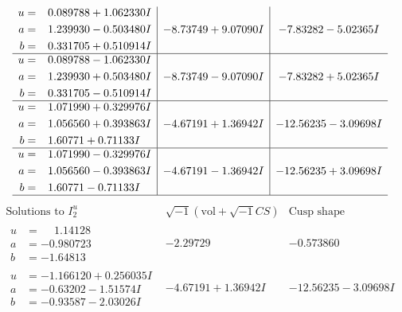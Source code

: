 \documentclass[1p]{elsarticle_modified}
\theoremstyle{definition}
\newcommand{\I}{\sqrt{-1}}
\begin{document}
$$\begin{array}{c|c|c}
\begin{aligned}
u &= \phantom{-}0.089788 + 1.062330 I \\
a &= \phantom{-}1.239930 - 0.503480 I \\
b &= \phantom{-}0.331705 + 0.510914 I\end{aligned}
 & -8.73749 + 9.07090 I & -7.83282 - 5.02365 I \\ \hline\begin{aligned}
u &= \phantom{-}0.089788 - 1.062330 I \\
a &= \phantom{-}1.239930 + 0.503480 I \\
b &= \phantom{-}0.331705 - 0.510914 I\end{aligned}
 & -8.73749 - 9.07090 I & -7.83282 + 5.02365 I \\ \hline\begin{aligned}
u &= \phantom{-}1.071990 + 0.329976 I \\
a &= \phantom{-}1.056560 + 0.393863 I \\
b &= \phantom{-}1.60771 + 0.71133 I\end{aligned}
 & -4.67191 + 1.36942 I & -12.56235 - 3.09698 I \\ \hline\begin{aligned}
u &= \phantom{-}1.071990 - 0.329976 I \\
a &= \phantom{-}1.056560 - 0.393863 I \\
b &= \phantom{-}1.60771 - 0.71133 I\end{aligned}
 & -4.67191 - 1.36942 I & -12.56235 + 3.09698 I\\
 \hline 
 \end{array}$$\newpage$$\begin{array}{c|c|c}  
\text{Solutions to }I^u_{2}& \I (\text{vol} + \sqrt{-1}CS) & \text{Cusp shape}\\
 \hline 
\begin{aligned}
u &= \phantom{-}1.14128\phantom{ +0.000000I} \\
a &= -0.980723\phantom{ +0.000000I} \\
b &= -1.64813\phantom{ +0.000000I}\end{aligned}
 & -2.29729\phantom{ +0.000000I} & -0.573860\phantom{ +0.000000I} \\ \hline\begin{aligned}
u &= -1.166120 + 0.256035 I \\
a &= -0.63202 - 1.51574 I \\
b &= -0.93587 - 2.03026 I\end{aligned}
 & -4.67191 + 1.36942 I & -12.56235 - 3.09698 I \\ \hline\begin{aligned}

\end{aligned}
\end{array}$$
\end{document}
